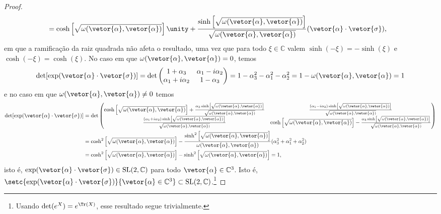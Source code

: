 \begin{proof}
\begin{align*}
        &= \cosh\left[\sqrt{\omega(\vetor{\alpha},\vetor{\alpha})}\right] \unity + \frac{\sinh\left[\sqrt{\omega(\vetor{\alpha}, \vetor{\alpha})}\right]}{\sqrt{\omega(\vetor{\alpha},\vetor{\alpha})}}(\vetor{\alpha}\cdot\vetor{\sigma}),
    \end{align*}
    em que a ramificação da raiz quadrada não afeta o resultado, uma vez que para todo \(\xi \in \mathbb{C}\) valem \(\sinh(-\xi) = -\sinh(\xi)\) e \(\cosh(-\xi) = \cosh(\xi)\).
    No caso em que \(\omega(\vetor{\alpha}, \vetor{\alpha}) = 0\), temos
    \begin{equation*}
        \det[\exp(\vetor{\alpha}\cdot\vetor{\sigma})] = \det \begin{pmatrix}
            1 + \alpha_3 & \alpha_1 - i \alpha_2\\
            \alpha_1 + i \alpha_2 & 1 - \alpha_3
        \end{pmatrix} = 1 - \alpha_3^2 - \alpha_1^2 - \alpha_2^2 = 1 - \omega(\vetor{\alpha}, \vetor{\alpha}) = 1
    \end{equation*}
    e no caso em que \(\omega(\vetor{\alpha}, \vetor{\alpha}) \neq 0\) temos
    \begin{align*}
        \det[\exp(\vetor{\alpha}\cdot\vetor{\sigma})]
        &= \det \begin{pmatrix}
            \cosh\left[\sqrt{\omega(\vetor{\alpha},\vetor{\alpha})}\right] + \frac{\alpha_3 \sinh\left[\sqrt{\omega(\vetor{\alpha},\vetor{\alpha})}\right]}{\sqrt{\omega(\vetor{\alpha},\vetor{\alpha})}} & \frac{(\alpha_1 - i \alpha_2) \sinh\left[\sqrt{\omega(\vetor{\alpha},\vetor{\alpha})}\right]}{\sqrt{\omega(\vetor{\alpha},\vetor{\alpha})}}\\
            \frac{(\alpha_1 + i \alpha_2) \sinh\left[\sqrt{\omega(\vetor{\alpha},\vetor{\alpha})}\right]}{\sqrt{\omega(\vetor{\alpha},\vetor{\alpha})}} & \cosh\left[\sqrt{\omega(\vetor{\alpha},\vetor{\alpha})}\right] - \frac{\alpha_3 \sinh\left[\sqrt{\omega(\vetor{\alpha},\vetor{\alpha})}\right]}{\sqrt{\omega(\vetor{\alpha},\vetor{\alpha})}}\\
        \end{pmatrix}\\
        &= \cosh^2\left[\sqrt{\omega(\vetor{\alpha},\vetor{\alpha})}\right] - \frac{\sinh^2\left[\sqrt{\omega(\vetor{\alpha},\vetor{\alpha})}\right]}{\omega(\vetor{\alpha}, \vetor{\alpha})}(\alpha_3^2 + \alpha_1^2 + \alpha_2^2)\\
        &= \cosh^2\left[\sqrt{\omega(\vetor{\alpha},\vetor{\alpha})}\right] - \sinh^2\left[\sqrt{\omega(\vetor{\alpha},\vetor{\alpha})}\right] = 1,
    \end{align*}
    isto é, \(\exp(\vetor{\alpha}\cdot \vetor{\sigma}) \in \mathrm{SL}(2, \mathbb{C})\) para todo \(\vetor{\alpha} \in \mathbb{C}^3\). Isto é, \(\setc{\exp(\vetor{\alpha}\cdot\vetor{\sigma})}{\vetor{\alpha} \in \mathbb{C}^3} \subset \mathrm{SL}(2,\mathbb{C})\).\footnote{Usando \(\det(e^X) = e^{\Tr(X)}\), esse resultado segue trivialmente.}


\end{proof}
